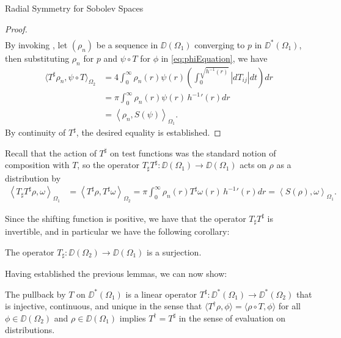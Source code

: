 \begin{chapter}{Radial Symmetry for Sobolev Spaces}
\begin{proof}
\begin{align}
  \end{align}
  By invoking , let $(\rho_n)$ be a sequence in $\DD(\Omega_1)$ converging to $p$ in $\DD^*(\Omega_1)$, then substituting $\rho_n$ for $p$ and $\psi \circ T$ for $\phi$ in \eqref{eq:phiEquation}, we have
  \begin{align}
    \langle T^\sharp \rho_n, \psi \circ T \rangle_{\Omega_2}  &= 4\int_0^\infty \rho_n(r) \psi(r)  \left(\int_0^{\sqrt{h^{-1}(r)}} \left|dT_{ij}\right| dt\right) dr \nonumber \\
      &= \pi \int_0^\infty \rho_n(r) \psi(r)\,{h^{-1}}'(r) dr \nonumber\\
      &= \left\langle \rho_n, S(\psi) \right\rangle_{\Omega_1}. \label{eq:pullbackInnerProd}
  \end{align}
  By continuity of $T^\sharp$, the desired equality is established.
\end{proof}

Recall that the action of $T^\sharp$ on test functions was the standard notion of composition with $T$, so the operator $T_{\sharp}T^\sharp :\DD(\Omega_1)\to \DD(\Omega_1)$ acts on $\rho$ as a distribution by
\begin{align}
  \left\langle T_{\sharp} T^\sharp \rho, \omega \right \rangle_{\Omega_1} 
  &= \left\langle T^\sharp \rho, T^{\sharp} \omega \right \rangle_{\Omega_2} = \pi \int_0^\infty \rho_n(r) T^{\sharp}\omega(r)\,{h^{-1}}'(r) dr = \left\langle S(\rho), \omega \right \rangle_{\Omega_1}.
\end{align}

Since the shifting function is positive, we have that the operator $T_\sharp T^{\sharp}$ is invertible, and in particular we have the following corollary:
\begin{cor} \label{cor:surjectiveTsharp}
  The operator $T_{\sharp}:\DD(\Omega_2)\to\DD(\Omega_1)$ is a surjection.
\end{cor}

Having established the previous lemmas, we can now show:
\begin{thm} \label{thm:pullback}
  The pullback by $T$ on $\DD^*(\Omega_1)$ is a linear operator $T^\sharp:\DD^*(\Omega_1) \to \DD^*(\Omega_2)$ that is injective, continuous, and unique in the sense that $\langle T^\dagger \rho ,\phi\rangle = \langle \rho \circ T,\phi\rangle$ for all $\phi \in \DD(\Omega_2)$ and $\rho \in \DD(\Omega_1)$ implies $T^\dagger = T^\sharp$ in the sense of evaluation on distributions.


\end{thm}
\end{chapter}

